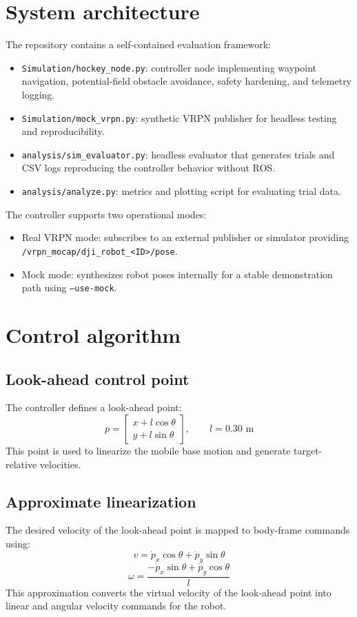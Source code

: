 \documentclass[11pt,a4paper]{article}
\begin{document}
\section{System architecture}
The repository contains a self-contained evaluation framework:
\begin{itemize}
  \item \texttt{Simulation/hockey_node.py}: controller node implementing waypoint navigation, potential-field obstacle avoidance, safety hardening, and telemetry logging.
  \item \texttt{Simulation/mock_vrpn.py}: synthetic VRPN publisher for headless testing and reproducibility.
  \item \texttt{analysis/sim_evaluator.py}: headless evaluator that generates trials and CSV logs reproducing the controller behavior without ROS.
  \item \texttt{analysis/analyze.py}: metrics and plotting script for evaluating trial data.
\end{itemize}

The controller supports two operational modes:
\begin{itemize}
  \item Real VRPN mode: subscribes to an external publisher or simulator providing \texttt{/vrpn_mocap/dji_robot\_<ID>/pose}.
  \item Mock mode: synthesizes robot poses internally for a stable demonstration path using \texttt{--use-mock}.
\end{itemize}

\section{Control algorithm}
\subsection{Look-ahead control point}
The controller defines a look-ahead point:
\[
  p = \begin{bmatrix} x + l\cos\theta \\ y + l\sin\theta \end{bmatrix}, \qquad l = 0.30\text{ m}
\]
This point is used to linearize the mobile base motion and generate target-relative velocities.

\subsection{Approximate linearization}
The desired velocity of the look-ahead point is mapped to body-frame commands using:
\[
  v = \dot{p}_x \cos\theta + \dot{p}_y \sin\theta
\]
\[
  \omega = \frac{-\dot{p}_x \sin\theta + \dot{p}_y \cos\theta}{l}
\]
This approximation converts the virtual velocity of the look-ahead point into linear and angular velocity commands for the robot.
\end{document}
